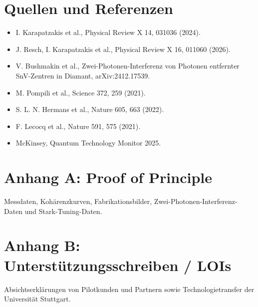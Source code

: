 \documentclass[11pt,oneside]{scrartcl}
\begin{document}
\section*{Quellen und Referenzen}
\begin{itemize}
  \item I. Karapatzakis et al., Physical Review X 14, 031036 (2024).
  \item J. Resch, I. Karapatzakis et al., Physical Review X 16, 011060 (2026).
  \item V. Bushmakin et al., Zwei-Photonen-Interferenz von Photonen entfernter SnV-Zentren in Diamant, arXiv:2412.17539.
  \item M. Pompili et al., Science 372, 259 (2021).
  \item S. L. N. Hermans et al., Nature 605, 663 (2022).
  \item F. Lecocq et al., Nature 591, 575 (2021).
  \item McKinsey, Quantum Technology Monitor 2025.
\end{itemize}

\section*{Anhang A: Proof of Principle}
Messdaten, Koh\"arenzkurven, Fabrikationsbilder, Zwei-Photonen-Interferenz-Daten und Stark-Tuning-Daten.

\section*{Anhang B: Unterst\"utzungsschreiben / LOIs}
Absichtserkl\"arungen von Pilotkunden und Partnern sowie Technologietransfer der Universit\"at Stuttgart.
\end{document}

